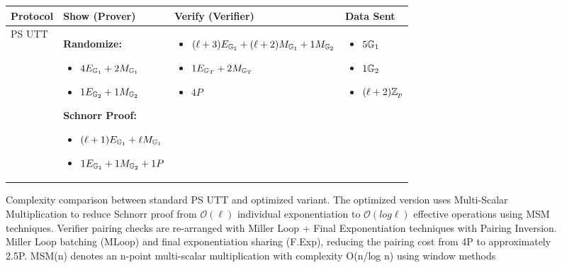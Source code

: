{\begin{figure}
    \centering
    \caption{Complexity comparison between standard PS UTT and optimized variant. The optimized version uses Multi-Scalar Multiplication to reduce Schnorr proof from $\mathcal{O}(\ell)$ individual exponentiation to $\mathcal{O}(log \ell)$ effective operations using MSM techniques. Verifier pairing checks are re-arranged with Miller Loop + Final Exponentiation techniques with Pairing Inversion. Miller Loop batching (MLoop) and final exponentiation sharing (F.Exp), reducing the pairing cost from 4P to approximately 2.5P. MSM(n) denotes an n-point multi-scalar multiplication with complexity O(n/log n) using window methods}
    \label{fig:enter-label}
        \begin{tabular}{|l|p{4.5cm}|p{4.5cm}|p{3.5cm}|}
            \hline
            \textbf{Protocol} & \textbf{Show (Prover)} & \textbf{Verify (Verifier)} & \textbf{Data Sent} \\
            \hline
            PS UTT &
            \textbf{Randomize:}
            \begin{itemize}[nosep]
                \item $4E_{\mathbb{G}_1} + 2M_{\mathbb{G}_1}$ 
                \item $1E_{\mathbb{G}_2} + 1M_{\mathbb{G}_2}$
            \end{itemize}
            \textbf{Schnorr Proof:}
            \begin{itemize}[nosep]
                \item $(\ell+1)E_{\mathbb{G}_1} + \ell M_{\mathbb{G}_1}$ 
                \item $1E_{\mathbb{G}_1} + 1M_{\mathbb{G}_2} + 1P$ 
            \end{itemize}
            &
            \begin{itemize}[nosep]
                \item $(\ell+3)E_{\mathbb{G}_1} + (\ell+2)M_{\mathbb{G}_1} + 1M_{\mathbb{G}_2}$
                \item $1E_{\mathbb{G}_T} + 2M_{\mathbb{G}_T}$
                \item $4P$ 
            \end{itemize}
            &
            \begin{itemize}[nosep]
                \item $5\mathbb{G}_1$
                \item $1\mathbb{G}_2$
                \item $(\ell+2)\mathbb{Z}_p$
            \end{itemize}
            \\
             \hline

\end{tabular}
\end{figure}}
